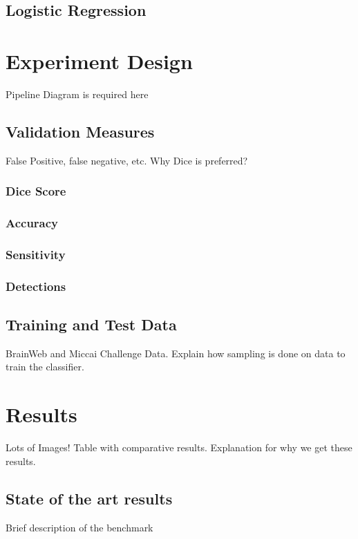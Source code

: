 \documentclass{article} %
\begin{document}
\subsection{Logistic Regression}

\section{Experiment Design}
Pipeline Diagram is required here

\subsection{Validation Measures}
False Positive, false negative, etc. Why Dice is preferred?
\subsubsection{Dice Score}
\subsubsection{Accuracy}
\subsubsection{Sensitivity}
\subsubsection{Detections}

\subsection{Training and Test Data}
BrainWeb and Miccai Challenge Data. Explain how sampling is done on data to train the classifier. 

\section{Results}
Lots of Images! Table with comparative results. Explanation for why we get these results. 

\subsection{State of the art results}
Brief description of the benchmark
\end{document}

